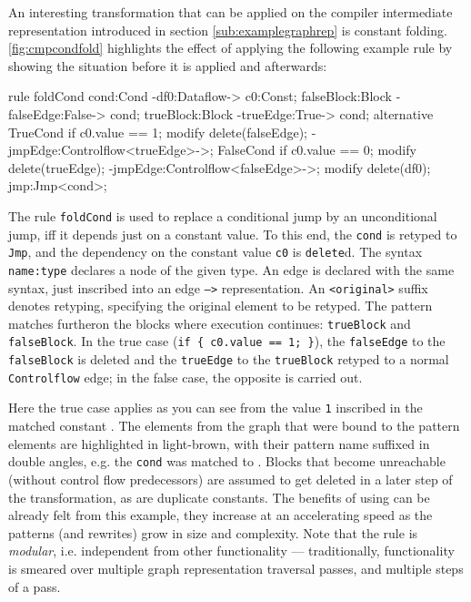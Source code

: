 An interesting transformation that can be applied on the compiler intermediate representation introduced in section \ref{sub:examplegraphrep} is constant folding.
\autoref{fig:cmpcondfold} highlights the effect of applying the following example rule by showing the situation before it is applied and afterwards:

\begin{grgen}
rule foldCond {
	cond:Cond -df0:Dataflow-> c0:Const;
	falseBlock:Block -falseEdge:False-> cond;
	trueBlock:Block -trueEdge:True-> cond;
	alternative {
		TrueCond {
			if { c0.value == 1; }
			modify {
				delete(falseEdge);
				-jmpEdge:Controlflow<trueEdge>->;
			}
		}
		FalseCond {
			if { c0.value == 0; }
			modify {
				delete(trueEdge);
				-jmpEdge:Controlflow<falseEdge>->;
			}
		}
	}
	modify {
		delete(df0);
		jmp:Jmp<cond>;
	}
}
\end{grgen}

The rule \texttt{foldCond} is used to replace a conditional jump by an unconditional jump, iff it depends just on a constant value.
To this end, the \texttt{cond} is retyped to \texttt{Jmp},
and the dependency on the constant value \texttt{c0} is \texttt{delete}d.
The syntax \texttt{name:type} declares a node of the given type.
An edge is declared with the same syntax, just inscribed into an edge \texttt{-->} representation.
An \texttt{<original>} suffix denotes retyping, specifying the original element to be retyped.
The pattern matches furtheron the blocks where execution continues: \texttt{trueBlock} and \texttt{falseBlock}.
In the true case (\texttt{if \{ c0.value == 1; \}}), the \texttt{falseEdge} to the \texttt{falseBlock} is deleted and the \texttt{trueEdge} to the \texttt{trueBlock} retyped to a normal \texttt{Controlflow} edge; in the false case, the opposite is carried out.

Here the true case applies as you can see from the value \texttt{1} inscribed in the matched constant .
The elements from the graph that were bound to the pattern elements are highlighted in light-brown, with their pattern name suffixed in double angles, e.g. the \texttt{cond} was matched to  .
Blocks that become unreachable (without control flow predecessors) are assumed to get deleted in a later step of the transformation,
as are duplicate constants.
The benefits of using \GrG{ }can be already felt from this example, they increase at an accelerating speed as the patterns (and rewrites) grow in size and complexity.
Note that the rule is \emph{modular}, i.e. independent from other functionality --- traditionally, functionality is smeared over multiple graph representation traversal passes, and multiple steps of a pass.

